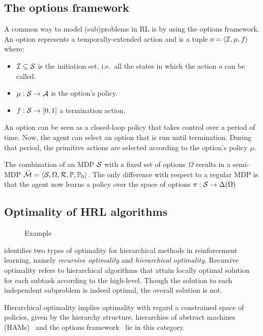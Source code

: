 \subsection{The options framework}
\label{section:options}
A common way to model (sub)problems in RL is by using the options framework. An option represents a temporally-extended action and is a tuple $o=\langle\mathcal{I}, \mu, f\rangle$ where:
\begin{itemize}
  \item $\mathcal{I}\subseteq\mathcal{S}$ is the initiation set, i.e.~all the states in which the action $o$ can be called.
  \item $\mu:\mathcal{S}\rightarrow\mathcal{A}$ is the option's policy.
  \item $f:\mathcal{S}\rightarrow[0, 1]$ a termination action.
\end{itemize}
An option can be seen as a closed-loop policy that takes control over a period of time. Now, the agent can select an option that is run until termination. During that period, the primitive actions are selected according to the option's policy $\mu$.

The combination of an MDP $\mathcal{S}$ with a fixed set of options $\Omega$ results in a semi-MDP $\tilde{\mathcal{M}}=\langle\mathcal{S},\Omega, \mathcal{R}, \mathbb{P}, \mathbb{P}_0\rangle$. The only difference with respect to a regular MDP is that the agent now learns a policy over the space of options $\pi:\mathcal{S}\rightarrow\Delta(\Omega)$

\subsection{Optimality of HRL algorithms}

\begin{figure}
  \centering
  
  \hspace{25pt}
  
  \caption{Example}
  \label{fig:hrl_optimality}
\end{figure}


\citet{Dietterich2000} identifies two types of optimality for hierarchical methods in reinforcement learning, namely \textit{recursive optimality} and \textit{hierarchical optimality}. Recursive optimality refers to hierarchical algorithms that attain locally optimal solution for each subtask according to the high-level. Though the solution to each independent subproblem is indeed optimal, the overall solution is not.


Hierarchical optimality implies optimality with regard a constrained space of policies, given by the hierarchy structure. hierarchies of abstract machines (HAMs)~\citet{Parr1997} and the options framework~\citep{Sutton1999} lie in this category.

